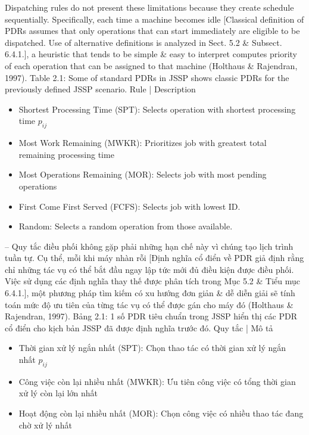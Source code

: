 \documentclass{article}
\begin{document}
\begin{itemize}
\begin{itemize}
\begin{itemize}
            Dispatching rules do not present these limitations because they create schedule sequentially. Specifically, each time a machine becomes idle [Classical definition of PDRs assumes that only operations that can start immediately are eligible to be dispatched. Use of alternative definitions is analyzed in Sect. 5.2 \& Subsect. 6.4.1.], a heuristic that tends to be simple \& easy to interpret computes priority of each operation that can be assigned to that machine (Holthaus \& Rajendran, 1997). {\sf Table 2.1: Some of standard PDRs in JSSP} shows classic PDRs for the previously defined JSSP scenario. Rule | Description
            \begin{itemize}
                \item Shortest Processing Time (SPT): Selects operation with shortest processing time $p_{ij}$
                \item Most Work Remaining (MWKR): Prioritizes job with greatest total remaining processing time
                \item Most Operations Remaining (MOR): Selects job with most pending operations
                \item First Come First Served (FCFS): Selects job with lowest ID.
                \item Random: Selects a random operation from those available.
            \end{itemize}
            -- Quy tắc điều phối không gặp phải những hạn chế này vì chúng tạo lịch trình tuần tự. Cụ thể, mỗi khi máy nhàn rỗi [Định nghĩa cổ điển về PDR giả định rằng chỉ những tác vụ có thể bắt đầu ngay lập tức mới đủ điều kiện được điều phối. Việc sử dụng các định nghĩa thay thế được phân tích trong Mục 5.2 \& Tiểu mục 6.4.1.], một phương pháp tìm kiếm có xu hướng đơn giản \& dễ diễn giải sẽ tính toán mức độ ưu tiên của từng tác vụ có thể được gán cho máy đó (Holthaus \& Rajendran, 1997). {\sf Bảng 2.1: 1 số PDR tiêu chuẩn trong JSSP} hiển thị các PDR cổ điển cho kịch bản JSSP đã được định nghĩa trước đó. Quy tắc | Mô tả
            \begin{itemize}
                \item Thời gian xử lý ngắn nhất (SPT): Chọn thao tác có thời gian xử lý ngắn nhất $p_{ij}$
                \item Công việc còn lại nhiều nhất (MWKR): Ưu tiên công việc có tổng thời gian xử lý còn lại lớn nhất
                \item Hoạt động còn lại nhiều nhất (MOR): Chọn công việc có nhiều thao tác đang chờ xử lý nhất

\end{itemize}
\end{itemize}
\end{itemize}
\end{itemize}
\end{document}
